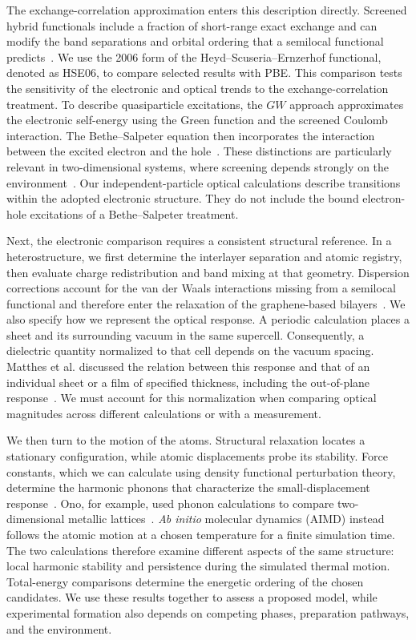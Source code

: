 The exchange-correlation approximation enters this description directly.
Screened hybrid functionals include a fraction of short-range exact exchange and can modify the band separations and orbital ordering that a semilocal functional predicts~\cite{heyd2003hybrid,krukau2006influence}.
We use the 2006 form of the Heyd--Scuseria--Ernzerhof functional, denoted as HSE06, to compare selected results with PBE.
This comparison tests the sensitivity of the electronic and optical trends to the exchange-correlation treatment.
To describe quasiparticle excitations, the $GW$ approach approximates the electronic self-energy using the Green function and the screened Coulomb interaction.
The Bethe--Salpeter equation then incorporates the interaction between the excited electron and the hole~\cite{onida2002electronic}.
These distinctions are particularly relevant in two-dimensional systems, where screening depends strongly on the environment~\cite{thygesen2017}.
Our independent-particle optical calculations describe transitions within the adopted electronic structure.
They do not include the bound electron-hole excitations of a Bethe--Salpeter treatment.

Next, the electronic comparison requires a consistent structural reference.
In a heterostructure, we first determine the interlayer separation and atomic registry, then evaluate charge redistribution and band mixing at that geometry.
Dispersion corrections account for the van der Waals interactions missing from a semilocal functional and therefore enter the relaxation of the graphene-based bilayers~\cite{grimme2010consistent,grimme2011effect}.
We also specify how we represent the optical response.
A periodic calculation places a sheet and its surrounding vacuum in the same supercell.
Consequently, a dielectric quantity normalized to that cell depends on the vacuum spacing.
Matthes et al. discussed the relation between this response and that of an individual sheet or a film of specified thickness, including the out-of-plane response~\cite{matthes2016influence}.
We must account for this normalization when comparing optical magnitudes across different calculations or with a measurement.

We then turn to the motion of the atoms.
Structural relaxation locates a stationary configuration, while atomic displacements probe its stability.
Force constants, which we can calculate using density functional perturbation theory, determine the harmonic phonons that characterize the small-displacement response~\cite{baroni2001phonons}.
Ono, for example, used phonon calculations to compare two-dimensional metallic lattices~\cite{ono2020dynamical}.
\textit{Ab initio} molecular dynamics (AIMD) instead follows the atomic motion at a chosen temperature for a finite simulation time.
The two calculations therefore examine different aspects of the same structure: local harmonic stability and persistence during the simulated thermal motion.
Total-energy comparisons determine the energetic ordering of the chosen candidates.
We use these results together to assess a proposed model, while experimental formation also depends on competing phases, preparation pathways, and the environment.

